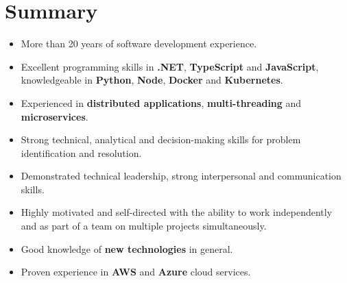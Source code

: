 \documentclass[11pt,a4paper,danish]{moderncv}        %
\begin{document}
\makecvtitle

\section{Summary}
\begin{itemize}
  \item	More than 20 years of software development experience.
  \item Excellent programming skills in \textbf{.NET}, \textbf{TypeScript} and \textbf{JavaScript},
        knowledgeable in \textbf{Python}, \textbf{Node}, \textbf{Docker} and \textbf{Kubernetes}.
  \item	Experienced in \textbf{distributed applications}, \textbf{multi-threading} and \textbf{microservices}.
  \item	Strong technical, analytical and decision-making skills for problem identification and resolution.
  \item	Demonstrated technical leadership, strong interpersonal and communication skills.
  \item	Highly motivated and self-directed with the ability to work independently and as part of a team on multiple projects simultaneously.
  \item	Good knowledge of \textbf{new technologies} in general.
  \item Proven experience in \textbf{AWS} and \textbf{Azure} cloud services.

\end{itemize}
\end{document}
